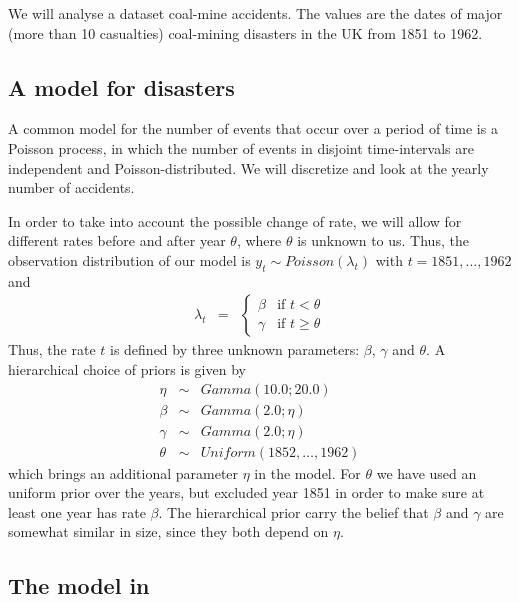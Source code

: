 \documentclass[11pt]{article}
\begin{document}
We will analyse a dataset coal-mine accidents.
The values are the dates of major (more than 10 casualties) coal-mining disasters in the UK from 1851 to 1962. 


\subsection*{A model for disasters}

A common model for the number of events that occur over a period of time is a Poisson process, in which the number of events in disjoint time-intervals are independent and Poisson-distributed. 
We will discretize and look at the yearly number of accidents. 

In order to take into account the possible change of rate, we will allow for different rates before and after year $\theta$, where $\theta$ is unknown to us. 
Thus, the observation distribution of our model is 
$y_t \sim Poisson(\lambda_t)$ with $t = 1851,\ldots,1962$ and
\begin{eqnarray*}
\lambda_t & = & \begin{cases}
\beta & \mbox{if } t < \theta \\
\gamma & \mbox{if } t \geq \theta
\end{cases}
\end{eqnarray*}
Thus, the rate $t$ is defined by three unknown parameters: $\beta$, $\gamma$ and $\theta$. A hierarchical choice of priors is given by
\begin{eqnarray*}
 \eta & \sim & Gamma(10.0;20.0) \\ 
 \beta & \sim & Gamma(2.0;\eta) \\
 \gamma & \sim &Gamma(2.0;\eta) \\
 \theta & \sim & Uniform(1852,\ldots,1962)
\end{eqnarray*}
which brings an additional parameter $\eta$ in the model. 
For $\theta$ we have used an uniform prior over the years, but excluded year 1851 in order to make sure at least one year has rate $\beta$. 
The hierarchical prior carry the belief that $\beta$ and $\gamma$ are somewhat similar in size,
since they both depend on $\eta$. 

\subsection*{The model in \Rev}
\end{document}
